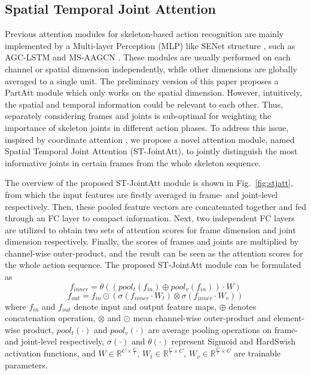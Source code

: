 \documentclass[10pt,journal,compsoc]{IEEEtran}
\begin{document}
\subsection{Spatial Temporal Joint Attention}
\label{ssec:stjatt}

Previous attention modules for skeleton-based action recognition are mainly implemented by a Multi-layer Perception (MLP) like SENet structure \cite{hu2018squeeze}, such as AGC-LSTM \cite{si2019attention} and MS-AAGCN \cite{shi2020skeleton}. These modules are usually performed on each channel or spatial dimension independently, while other dimensions are globally averaged to a single unit. The preliminary version of this paper \cite{song2020stronger} proposes a PartAtt module which only works on the spatial dimension. However, intuitively, the spatial and temporal information could be relevant to each other. Thus, separately considering frames and joints is sub-optimal for weighting the importance of skeleton joints in different action phases. To address this issue, inspired by coordinate attention \cite{hou2021coordinate}, we propose a novel attention module, named Spatial Temporal Joint Attention (ST-JointAtt), to jointly distinguish the most informative joints in certain frames from the whole skeleton sequence.

The overview of the proposed ST-JointAtt module is shown in Fig.~\ref{fig:stjatt}, from which the input features are firstly averaged in frame- and joint-level respectively. Then, these pooled feature vectors are concatenated together and fed through an FC layer to compact information. Next, two independent FC layers are utilized to obtain two sets of attention scores for frame dimension and joint dimension respectively. Finally, the scores of frames and joints are multiplied by channel-wise outer-product, and the result can be seen as the attention scores for the whole action sequence. The proposed ST-JointAtt module can be formulated as
\begin{equation}
  f_{inner}=\theta((pool_t(f_{in}) \oplus pool_v(f_{in}))\cdot W)
\end{equation}
\begin{equation}
  f_{out}=f_{in}\odot(\sigma(f_{inner}\cdot W_t)\otimes\sigma(f_{inner}\cdot W_v))
\end{equation}
where $f_{in}$ and $f_{out}$ denote input and output feature maps, $\oplus$ denotes concatenation operation, $\otimes$ and $\odot$ mean channel-wise outer-product and element-wise product, $pool_t(\cdot)$ and $pool_v(\cdot)$ are average pooling operations on frame- and joint-level respectively, $\sigma(\cdot)$ and $\theta(\cdot)$ represent Sigmoid and HardSwish  \cite{howard2019searching} activation functions, and $W\in\mathbb{R}^{C\times\frac{C}{r}}$, $W_t\in\mathbb{R}^{\frac{C}{r}\times C}$, $W_v\in\mathbb{R}^{\frac{C}{r}\times C}$ are trainable parameters.
\end{document}
